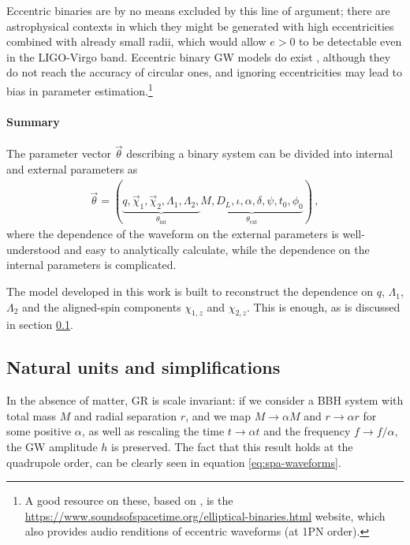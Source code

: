 \documentclass[main.tex]{subfiles}
\begin{document}
Eccentric binaries are by no means excluded by this line of argument; there are astrophysical contexts in which they might be generated with high eccentricities combined with already small radii, which would allow \(e > 0\) to be detectable even in the \ac{LIGO}-Virgo band.
Eccentric binary \ac{GW} models do exist \cite{favataConstrainingOrbitalEccentricity2021}, although they do not reach the accuracy of circular ones, and ignoring eccentricities may lead to bias in parameter estimation.\footnote{A good resource on these, based on \textcite{favataGravitationalwaveMemoryEccentric2011}, is the \href{Sounds of Spacetime}{https://www.soundsofspacetime.org/elliptical-binaries.html} website, which also provides audio renditions of eccentric waveforms (at 1\ac{PN} order).}

\paragraph{Summary}

The parameter vector \(\vec{\theta}\) describing a binary system can be divided into internal and external parameters as 
%
\begin{align}
\vec{\theta} = (\underbrace{q, \vec{\chi}_1, \vec{\chi}_2, \Lambda_1, \Lambda_2,}_{\theta _{\text{int}}} \underbrace{M, D_L, \iota, \alpha, \delta, \psi, t_0, \phi_0 }_{\theta _{\text{ext}}})
\,,
\end{align}
%
where the dependence of the waveform on the external parameters is well-understood and easy to analytically calculate, while the dependence on the internal parameters is complicated.

The model developed in this work is built to reconstruct the dependence on \(q\), \(\Lambda_1\), \(\Lambda_2 \) and the aligned-spin components \(\chi_{1,z} \) and \(\chi_{2, z}\).
This is enough, as is discussed in section \ref{sec:natural-units}. 

\subsection{Natural units and simplifications} \label{sec:natural-units}

In the absence of matter, \ac{GR} is scale invariant: if we consider a \ac{BBH} system with total mass \(M\) and radial separation \(r\),
and we map \(M \to \alpha M\) and \(r \to \alpha r\) for some positive \(\alpha \), as well as rescaling the time \(t \to \alpha t \) and the frequency \(f \to f / \alpha \), the \ac{GW} amplitude \(h\) is preserved. 
The fact that this result holds at the quadrupole order, can be clearly seen in equation \ref{eq:spa-waveforms}.
\end{document}
